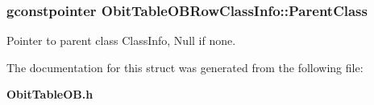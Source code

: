 \subsubsection{\setlength{\rightskip}{0pt plus 5cm}gconstpointer {\bf Obit\-Table\-OBRow\-Class\-Info::Parent\-Class}}\label{structObitTableOBRowClassInfo_o3}


Pointer to parent class Class\-Info, Null if none. 



The documentation for this struct was generated from the following file:\begin{CompactItemize}
\item 
{\bf Obit\-Table\-OB.h}\end{CompactItemize}
